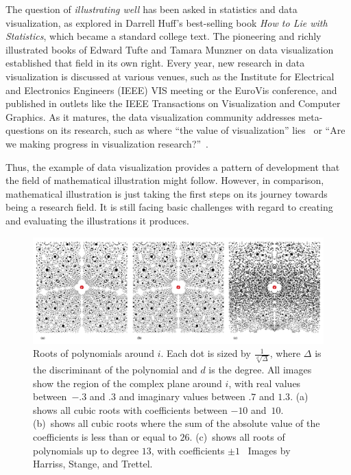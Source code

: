 \documentclass{notices}
\begin{document}
The question of \emph{illustrating well} has been asked in statistics and data visualization, as explored in Darrell Huff's best-selling book \emph{How to Lie with Statistics}, which became a standard college text.
The pioneering and richly illustrated books of Edward Tufte and Tamara Munzner on data visualization established that field in its own right. Every year, new research in data visualization is discussed at various venues, such as the Institute for Electrical and Electronics Engineers (IEEE) VIS meeting or the EuroVis conference, and published in outlets like the IEEE Transactions on Visualization and Computer Graphics. As it matures, the data visualization community addresses meta-questions on its research, such as where ``the value of visualization'' lies~\cite{van2005value} 
or ``Are we making progress in visualization research?''~\cite{correll2022we}.

Thus, the example of data visualization provides a pattern of development that  the field of mathematical illustration might follow.
However, in comparison, mathematical illustration is just taking the first steps on its journey towards being a research field. 
It is still facing basic challenges with regard to creating and evaluating the illustrations it produces.

\begin{figure}
    \includegraphics[width=\textwidth]{images/Aroundi.jpg}
    \caption{Roots of polynomials around $i$. Each dot is sized by $\frac{1}{\sqrt[d]{\Delta}}$, where $\Delta$ is the discriminant of the polynomial and $d$ is the degree. All images show the region of the complex plane around $i$, with real values between~$-.3$ and $.3$ and imaginary values between $.7$ and $1.3$. (a) shows all cubic roots with coefficients between $-10$ and~$10$. (b)~shows all cubic roots where the sum of the absolute value of the coefficients is less than or equal to $26$. (c)~shows all roots of polynomials up to degree $13$, with coefficients $\pm 1$~\cite{HST22} Images by Harriss, Stange, and Trettel.}
    \label{fig:aroundi}
\end{figure}
\end{document}
